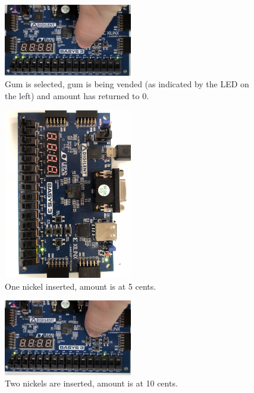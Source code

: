 \documentclass[11pt]{article}
\begin{document}
\begin{figure}[H]
\begin{center}
	\includegraphics[width=0.5\textwidth]{./images/lab10img4.jpg}
	\caption{\label{fig:lab10_img4}Gum is selected, gum is being vended (as indicated by the LED on the left) and amount has returned to 0.}
\end{center}
\end{figure}

\begin{figure}[H]
\begin{center}
	\includegraphics[width=0.5\textwidth]{./images/lab10img5.jpg}
	\caption{\label{fig:lab10_img5}One nickel inserted, amount is at 5 cents.}
\end{center}
\end{figure}

\begin{figure}[H]
\begin{center}
	\includegraphics[width=0.5\textwidth]{./images/lab10img6.jpg}
	\caption{\label{fig:lab10_img6}Two nickels are inserted, amount is at 10 cents.}
\end{center}
\end{figure}
\end{document}
